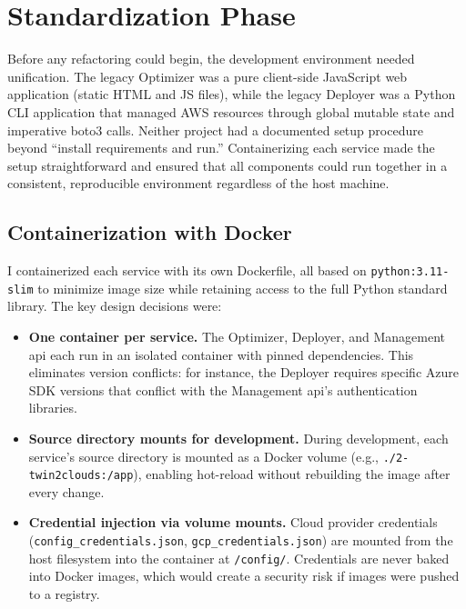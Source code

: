 \section{Standardization Phase}
\label{sec:standardization}

Before any refactoring could begin, the development environment needed unification. The legacy Optimizer was a pure client-side JavaScript web application (static HTML and JS files), while the legacy Deployer was a Python CLI application that managed AWS resources through global mutable state and imperative boto3 calls. Neither project had a documented setup procedure beyond ``install requirements and run.'' Containerizing each service made the setup straightforward and ensured that all components could run together in a consistent, reproducible environment regardless of the host machine.

\subsection{Containerization with Docker}
\label{sec:containerization}

I containerized each service with its own Dockerfile, all based on \texttt{python:3.11-slim} to minimize image size while retaining access to the full Python standard library. The key design decisions were:

\begin{itemize}
    \item \textbf{One container per service.} The Optimizer, Deployer, and Management \gls{api} each run in an isolated container with pinned dependencies. This eliminates version conflicts: for instance, the Deployer requires specific Azure SDK versions that conflict with the Management \gls{api}'s authentication libraries.
    \item \textbf{Source directory mounts for development.} During development, each service's source directory is mounted as a Docker volume (e.g., \texttt{./2-twin2clouds:/app}), enabling hot-reload without rebuilding the image after every change.
    \item \textbf{Credential injection via volume mounts.} Cloud provider credentials (\texttt{config\_credentials.json}, \texttt{gcp\_credentials.json}) are mounted from the host filesystem into the container at \texttt{/config/}. Credentials are never baked into Docker images, which would create a security risk if images were pushed to a registry.
\end{itemize}

